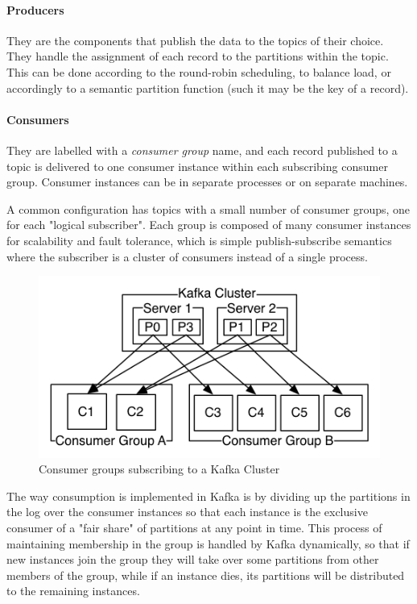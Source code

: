\paragraph{Producers} They are the components that publish the data to the topics of their choice. They handle the assignment of each record to the partitions within the topic. This can be done according to the round-robin scheduling, to balance load, or accordingly to a semantic partition function (such it may be the key of a record).

\paragraph{Consumers} They are labelled with a \textit{consumer group} name, and each record published to a topic is delivered to one consumer instance within each subscribing consumer group. Consumer instances can be in separate processes or on separate machines.

A common configuration has topics with a small number of consumer groups, one for each "logical subscriber". Each group is composed of many consumer instances for scalability and fault tolerance, which is simple publish-subscribe semantics where the subscriber is a cluster of consumers instead of a single process.

\begin{figure}[h]
    \centering
    \includegraphics[width=0.7\linewidth]{Figures/consumer-groups}
    \caption[Consumer groups subscribing to a Kafka Cluster]{Consumer groups subscribing to a Kafka Cluster}
    \label{fig:consumer-groups}
\end{figure}


The way consumption is implemented in Kafka is by dividing up the partitions in the log over the consumer instances so that each instance is the exclusive consumer of a "fair share" of partitions at any point in time. This process of maintaining membership in the group is handled by Kafka dynamically, so that if new instances join the group they will take over some partitions from other members of the group, while if an instance dies, its partitions will be distributed to the remaining instances.

